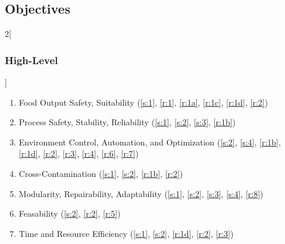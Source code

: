 \documentclass{../tex/report}
\begin{document}
\clearpage

\subsection{Objectives}
\label{sec:objectives}

\begin{multicols}{2}[\subsubsection{High-Level}\label{sec:hlos}]
    \begin{enumerate}[label=HL\arabic*., ref=HL\arabic*]
        \item \label{hl:output} Food Output Safety, Suitability \hfill (\ref{s:1}, \ref{r:1}, \ref{r:1a}, \ref{r:1c}, \ref{r:1d}, \ref{r:2})
        \item \label{hl:safety} Process Safety, Stability, Reliability \hfill (\ref{s:1}, \ref{s:2}, \ref{s:3}, \ref{r:1b})
        \item \label{hl:environment} Environment Control, Automation, and Optimization \hfill (\ref{s:2}, \ref{s:4}, \ref{r:1b}, \ref{r:1d}, \ref{r:2}, \ref{r:3}, \ref{r:4}, \ref{r:6}, \ref{r:7})
        \item \label{hl:contamination} Cross-Contamination \hfill (\ref{s:1}, \ref{s:2}, \ref{r:1b}, \ref{r:2})
        \item \label{hl:modularity} Modularity, Repairability, Adaptability \hfill (\ref{s:1}, \ref{s:2}, \ref{s:3}, \ref{s:4}, \ref{r:8})
        \item \label{hl:feasability} Feasability \hfill (\ref{s:2}, \ref{r:2}, \ref{r:5})
        \item \label{hl:efficiency} Time and Resource Efficiency \hfill (\ref{s:1}, \ref{s:2}, \ref{r:1d}, \ref{r:2}, \ref{r:3})
    \end{enumerate}
\end{multicols}
\end{document}
